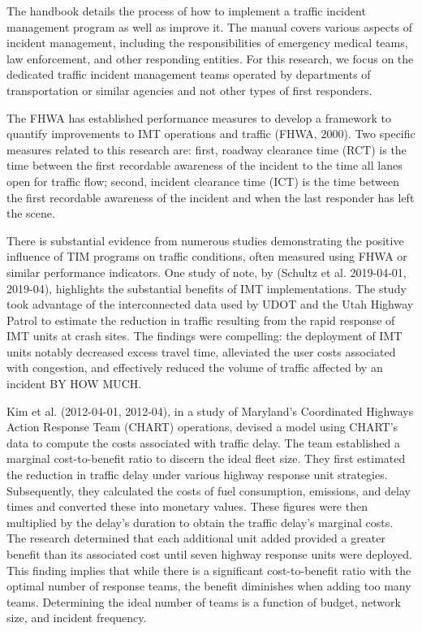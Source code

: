 \documentclass[
  letterpaper,
  DIV=11,
  numbers=noendperiod]{scrreprt}
\begin{document}
The handbook details the process of how to implement a traffic incident
management program as well as improve it. The manual covers various
aspects of incident management, including the responsibilities of
emergency medical teams, law enforcement, and other responding entities.
For this research, we focus on the dedicated traffic incident management
teams operated by departments of transportation or similar agencies and
not other types of first responders.

The FHWA has established performance measures to develop a framework to
quantify improvements to IMT operations and traffic (FHWA, 2000). Two
specific measures related to this research are: first, roadway clearance
time (RCT) is the time between the first recordable awareness of the
incident to the time all lanes open for traffic flow; second, incident
clearance time (ICT) is the time between the first recordable awareness
of the incident and when the last responder has left the scene.

There is substantial evidence from numerous studies demonstrating the
positive influence of TIM programs on traffic conditions, often measured
using FHWA or similar performance indicators. One study of note, by
(Schultz et al. 2019-04-01, 2019-04), highlights the substantial
benefits of IMT implementations. The study took advantage of the
interconnected data used by UDOT and the Utah Highway Patrol to estimate
the reduction in traffic resulting from the rapid response of IMT units
at crash sites. The findings were compelling: the deployment of IMT
units notably decreased excess travel time, alleviated the user costs
associated with congestion, and effectively reduced the volume of
traffic affected by an incident BY HOW MUCH.

Kim et al. (2012-04-01, 2012-04), in a study of Maryland's Coordinated
Highways Action Response Team (CHART) operations, devised a model using
CHART's data to compute the costs associated with traffic delay. The
team established a marginal cost-to-benefit ratio to discern the ideal
fleet size. They first estimated the reduction in traffic delay under
various highway response unit strategies. Subsequently, they calculated
the costs of fuel consumption, emissions, and delay times and converted
these into monetary values. These figures were then multiplied by the
delay's duration to obtain the traffic delay's marginal costs. The
research determined that each additional unit added provided a greater
benefit than its associated cost until seven highway response units were
deployed. This finding implies that while there is a significant
cost-to-benefit ratio with the optimal number of response teams, the
benefit diminishes when adding too many teams. Determining the ideal
number of teams is a function of budget, network size, and incident
frequency.
\end{document}

